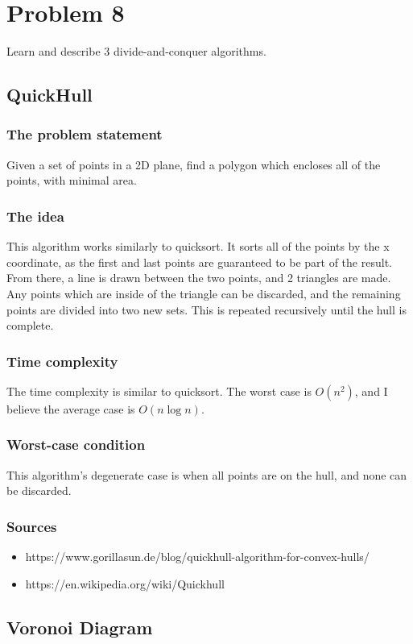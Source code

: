 \documentclass{article}
\begin{document}
\section{Problem 8}
\begin{em}
Learn and describe 3 divide-and-conquer algorithms.
\end{em}
\subsection{QuickHull}
\subsubsection{The problem statement}
Given a set of points in a 2D plane, find a polygon which encloses all of the points, with minimal area.
\subsubsection{The idea}
This algorithm works similarly to quicksort.
It sorts all of the points by the x coordinate, as the first and last points are guaranteed to be part of the result.
From there, a line is drawn between the two points, and 2 triangles are made.
Any points which are inside of the triangle can be discarded, and the remaining points are divided into two new sets.
This is repeated recursively until the hull is complete.
\subsubsection{Time complexity}
The time complexity is similar to quicksort. The worst case is \(O(n^2)\), and I believe the average case is \(O(n \log n)\).
\subsubsection{Worst-case condition}
This algorithm's degenerate case is when all points are on the hull, and none can be discarded.
\subsubsection{Sources}
\begin{itemize}
    \item https://www.gorillasun.de/blog/quickhull-algorithm-for-convex-hulls/
    \item https://en.wikipedia.org/wiki/Quickhull
\end{itemize}
\subsection{Voronoi Diagram}
\end{document}
